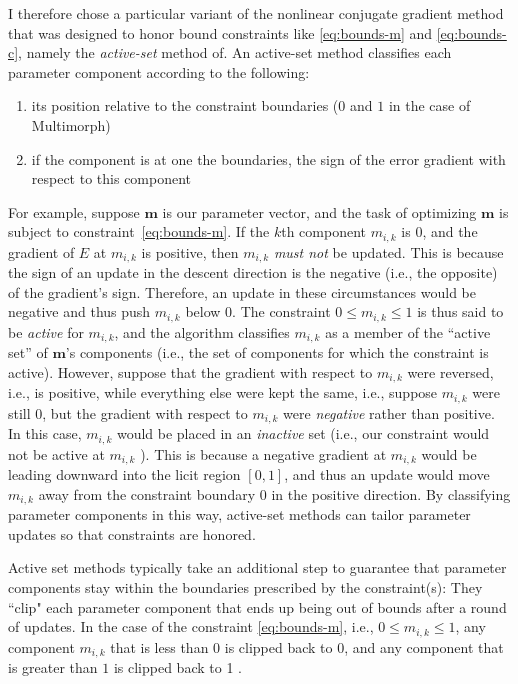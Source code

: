 I therefore chose a particular variant of the nonlinear conjugate gradient method that was designed to honor bound constraints like \eqref{eq:bounds-m} and \eqref{eq:bounds-c}, namely the \emph{active-set} method of\citet{cheng-and-li:2012}. 
An active-set method classifies
each parameter component according to the following:
\begin{enumerate}
\item its position relative to the constraint boundaries ($0$ and $1$ in the case of Multimorph)
\item if the component is at one the boundaries, the sign of the error gradient with respect to this component
\end{enumerate}
For example, suppose $\textbf{m}$ is our parameter vector, and the task of optimizing $\textbf{m}$ is
subject to constraint~\ref{eq:bounds-m}. If the $k$th component $m_{i,k}$ is $0$, and the gradient of $E$ 
at $m_{i,k}$ is positive, then $m_{i,k}$ \emph{must not} be updated. This is
because the sign of an update in the descent direction is the negative (i.e., the opposite) of the gradient's sign. Therefore,
an update in these circumstances would be negative and thus push $m_{i,k}$ below $0$.
The constraint $0 \leq m_{i,k }\leq 1$ is thus said to be
\emph{active} 
for $m_{i,k}$, and the algorithm classifies $m_{i,k}$ as a member of the ``active set'' of 
$\textbf{m}$'s components (i.e., the set of components for which the constraint is active).
However, suppose that the gradient with respect to $m_{i,k}$ were reversed, i.e., is positive, while everything else were kept the same, i.e., suppose 
$m_{i,k}$ were still $0$, but the gradient with respect to $m_{i,k}$ were \emph{negative} 
rather than positive. 
In this case, $m_{i,k}$ would be placed in an \emph{inactive} set (i.e., our constraint 
would not be active at $m_{i,k}$ ). This is because a negative
gradient at $m_{i,k}$ would be leading downward into the licit region $[0,1]$, and 
thus an update would move $m_{i,k}$ away from the constraint boundary $0$ in the 
positive direction. 
By classifying 
parameter components in this way, active-set methods can tailor parameter updates 
so that constraints are honored. 

Active set methods typically take an 
additional step to guarantee that parameter components stay within the boundaries 
prescribed by the constraint(s): They ``clip" each parameter component that ends up being out 
of bounds after a round of updates. In the case of the constraint \eqref{eq:bounds-m}, i.e., $0 \leq m_{i,k} \leq 1$,
any component $m_{i,k}$ that is less than $0$ is clipped back to $0$, and any component that is greater 
than $1$ is clipped back to 1 \citep{ni:yuan:1997}.

